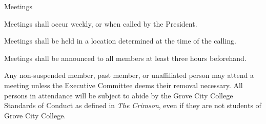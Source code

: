 {
	\begin{article}{Meetings}
		\item Meetings shall occur weekly, or when called by the President.
		\item Meetings shall be held in a location determined at the time of the calling.
		\item Meetings shall be announced to all members at least three hours beforehand.
		\item Any non-suspended member, past member, or unaffiliated person may attend a meeting unless the Executive Committee deems their removal necessary. All persons in attendance will be subject to abide by the Grove City College Standards of Conduct as defined in \textit{The Crimson}, even if they are not students of Grove City College.
	\end{article}
}
